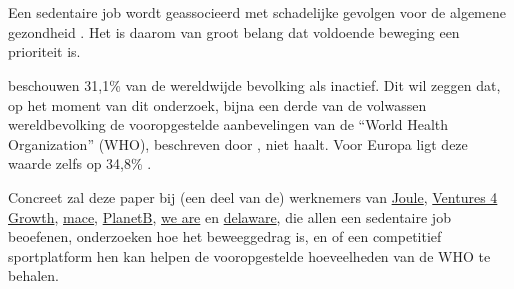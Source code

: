 
\chapter{}%
\label{ch:inleiding}


\section{}%
\label{sec:probleemstelling}

Een sedentaire job wordt geassocieerd met schadelijke gevolgen voor de algemene gezondheid \autocite{Buckley2015}. Het is daarom van groot belang dat voldoende beweging een prioriteit is.

\textcite{Hallal2012} beschouwen 31,1\% van de wereldwijde bevolking als inactief. Dit wil zeggen dat, op het moment van dit onderzoek, bijna een derde van de volwassen wereldbevolking de vooropgestelde aanbevelingen van de ``World Health Organization'' (WHO), beschreven door \textcite{Bull2020}, niet haalt. Voor Europa ligt deze waarde zelfs op 34,8\% \autocite{Bull2020}.

Concreet zal deze paper bij (een deel van de) werknemers van \href{https://en.joule.be/}{Joule}, \href{https://www.ventures4growth.com/en}{Ventures 4 Growth}, \href{https://www.mace-legal.com/}{mace}, \href{https://planetb.life/en}{PlanetB}, \href{https://www.we-are.be/}{we are} en \href{https://www.delaware.pro/en-be}{delaware}, die allen een sedentaire job beoefenen, onderzoeken hoe het beweeggedrag is, en of een competitief sportplatform hen kan helpen de vooropgestelde hoeveelheden van de WHO te behalen.

